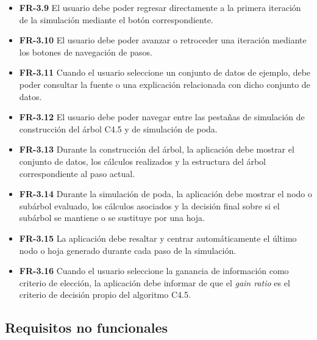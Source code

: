 \begin{itemize}
\begin{itemize}
    \item \textbf{FR-3.9} El usuario debe poder regresar directamente a la primera iteración de la simulación mediante el botón correspondiente.

    \item \textbf{FR-3.10} El usuario debe poder avanzar o retroceder una iteración mediante los botones de navegación de pasos.

    \item \textbf{FR-3.11} Cuando el usuario seleccione un conjunto de datos de ejemplo, debe poder consultar la fuente o una explicación relacionada con dicho conjunto de datos.

    \item \textbf{FR-3.12} El usuario debe poder navegar entre las pestañas de simulación de construcción del árbol C4.5 y de simulación de poda.

    \item \textbf{FR-3.13} Durante la construcción del árbol, la aplicación debe mostrar el conjunto de datos, los cálculos realizados y la estructura del árbol correspondiente al paso actual.

    \item \textbf{FR-3.14} Durante la simulación de poda, la aplicación debe mostrar el nodo o subárbol evaluado, los cálculos asociados y la decisión final sobre si el subárbol se mantiene o se sustituye por una hoja.

    \item \textbf{FR-3.15} La aplicación debe resaltar y centrar automáticamente el último nodo o hoja generado durante cada paso de la simulación.

    \item \textbf{FR-3.16} Cuando el usuario seleccione la ganancia de información como criterio de elección, la aplicación debe informar de que el \textit{gain ratio}  es el criterio de decisión propio del algoritmo C4.5.
\end{itemize}


\end{itemize}

\subsection{Requisitos no funcionales}

